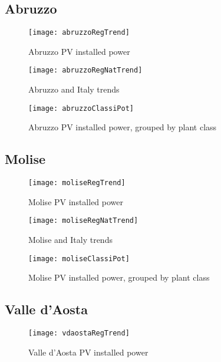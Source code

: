 \documentclass[12pt,a4paper,openright,twoside]{report}
\begin{document}
\subsection*{Abruzzo}

\begin{figure}[hp]
	\centering
	\texttt{[image: abruzzoRegTrend]}
	\caption{Abruzzo PV installed power}
	\label{abruzzoRegTrend}
\end{figure}

\begin{figure}[hp]
	\centering
	\texttt{[image: abruzzoRegNatTrend]}
	\caption{Abruzzo and Italy trends}
	\label{abruzzoRegNatTrend}
\end{figure}

\begin{figure}[hp]
	\centering
	\texttt{[image: abruzzoClassiPot]}
	\caption{Abruzzo PV installed power, grouped by plant class}
	\label{abruzzoClassiPot}
\end{figure}

\clearpage

\subsection*{Molise}

\begin{figure}[hp]
	\centering
	\texttt{[image: moliseRegTrend]}
	\caption{Molise PV installed power}
	\label{moliseRegTrend}
\end{figure}

\begin{figure}[hp]
	\centering
	\texttt{[image: moliseRegNatTrend]}
	\caption{Molise and Italy trends}
	\label{moliseRegNatTrend}
\end{figure}

\clearpage

\begin{figure}[hp]
	\centering
	\texttt{[image: moliseClassiPot]}
	\caption{Molise PV installed power, grouped by plant class}
	\label{moliseClassiPot}
\end{figure}



\subsection*{Valle d'Aosta}

\begin{figure}[hp]
	\centering
	\texttt{[image: vdaostaRegTrend]}
	\caption{Valle d'Aosta PV installed power}
	\label{vdaostaRegTrend}
\end{figure}
\end{document}
